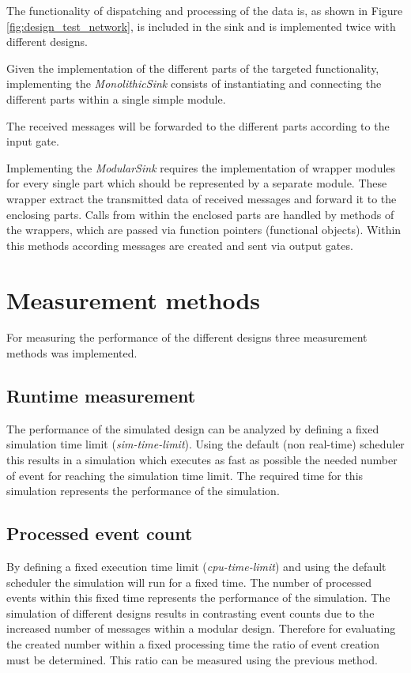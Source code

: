 The functionality of dispatching and processing of the data is, as shown in Figure \ref{fig:design_test_network}, is included in the sink and is implemented twice with different designs.


Given the implementation of the different parts of the targeted functionality, implementing the \emph{MonolithicSink} consists of instantiating and connecting the different parts within a single simple module.

The received messages will be forwarded to the different parts according to the input gate.

Implementing the \emph{ModularSink} requires the implementation of wrapper modules for every single part which should be represented by a separate module.
These wrapper extract the transmitted data of received messages and forward it to the enclosing parts.
Calls from within the enclosed parts are handled by methods of the wrappers, which are passed via function pointers (functional objects).
Within this methods according messages are created and sent via output gates.

\section{Measurement methods}
\label{sec:measurements_methods}
For measuring the performance of the different designs three measurement methods was implemented.

\subsection{Runtime measurement}
\label{sec:measurements_methods_runtime}
The performance of the simulated design can be analyzed by defining a fixed simulation time limit (\emph{sim-time-limit}).
Using the default (non real-time) scheduler this results in a simulation which executes as fast as possible the needed number of event for reaching the simulation time limit.
The required time for this simulation represents the performance of the simulation.

\subsection{Processed event count}
\label{sec:measurements_methods_event}
By defining a fixed execution time limit (\emph{cpu-time-limit}) and using the default scheduler the simulation will run for a fixed time.
The number of processed events within this fixed time represents the performance of the simulation.
The simulation of different designs results in contrasting event counts due to the increased number of messages within a modular design.
Therefore for evaluating the created number within a fixed processing time the ratio of event creation must be determined.
This ratio can be measured using the previous method.

